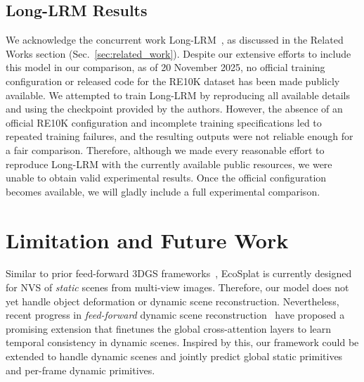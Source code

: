 \subsection{Long-LRM Results}
We acknowledge the concurrent work Long-LRM~\cite{ziwen2025long}, as discussed in the Related Works section (Sec.~\ref{sec:related_work}). Despite our extensive efforts to include this model in our comparison, as of 20 November 2025, no official training configuration or released code for the RE10K dataset has been made publicly available. We attempted to train Long-LRM by reproducing all available details and using the checkpoint provided by the authors. However, the absence of an official RE10K configuration and incomplete training specifications led to repeated training failures, and the resulting outputs were not reliable enough for a fair comparison. Therefore, although we made every reasonable effort to reproduce Long-LRM with the currently available public resources, we were unable to obtain valid experimental results. Once the official configuration becomes available, we will gladly include a full experimental comparison.

\section{Limitation and Future Work}
Similar to prior feed-forward 3DGS frameworks~\cite{xu2025depthsplat, chen2024mvsplat, charatan2024pixelsplat, ye2024no, huang2025no, jiang2025anysplat, liu2025worldmirror}, EcoSplat is currently designed for NVS of \textit{static} scenes from multi-view images. Therefore, our model does not yet handle object deformation or dynamic scene reconstruction. Nevertheless, recent progress in \textit{feed-forward} dynamic scene reconstruction~\cite{xiao2025spatialtrackerv2, wang20254realvideov2fusedviewtimeattention} have proposed a promising extension that finetunes the global cross-attention layers to learn temporal consistency in dynamic scenes. Inspired by this, our framework could be extended to handle dynamic scenes and jointly predict global static primitives and per-frame dynamic primitives.


